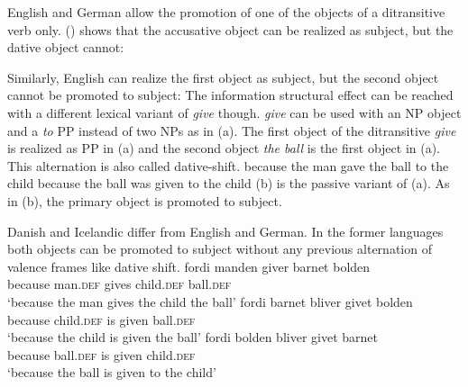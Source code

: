 English and German allow the promotion of one of the objects of a ditransitive verb only. ()
shows that the accusative object can be realized as subject, but the dative object cannot:
\eal
{}
\zl

Similarly, English can realize the first object as subject, but the second object cannot be promoted
to subject:
\eal
{}
\zl
The information structural effect can be reached with a different lexical variant of \emph{give}
though. \emph{give} can be used with an NP object and a \emph{to} PP instead of two NPs as in
(a). The first object of the ditransitive \emph{give} is realized as PP in (a) and the
second object \emph{the ball} is the first object in (a). This alternation is also called dative-shift.
\eal
\ex because the man gave the ball to the child
\ex because the ball was given to the child
\zl
(b) is the passive variant of (a). As in (b), the primary object is promoted
to subject.

Danish and Icelandic differ from English and German. In the former languages both objects can be
promoted to subject without any previous alternation of valence frames like dative shift.
\eal
\ex\label{ex-fordi-manden-giver-barnet-bolden} 
\gll fordi manden giver barnet bolden\\ 
     because man.\textsc{def} gives child.\textsc{def} ball.\textsc{def}\\\danish
\glt `because the man gives the child the ball'
\ex\label{ex-child-was-given-ball-danish}
\gll fordi barnet bliver givet bolden\\ 
     because child.\textsc{def} is given ball.\textsc{def}\\
\glt `because the child is given the ball'
\ex\label{ex-ball-was-given-child-danish}
\gll fordi bolden bliver givet barnet\\ 
     because ball.\textsc{def} is given child.\textsc{def}\\
\glt `because the ball is given to the child'
\zl

